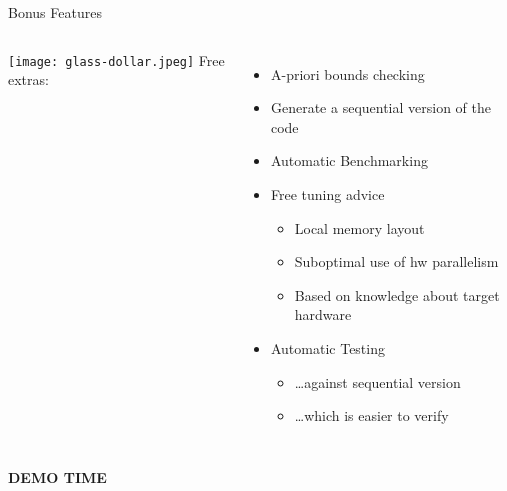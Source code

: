 \documentclass[english,compress]{beamer}
\def\bigncentered#1{
  \begin{center}
    \Huge\bfseries #1
  \end{center}
}
\begin{document}
\begin{frame}{Bonus Features}
  \begin{columns}
      \texttt{[image: glass-dollar.jpeg]}
      Free extras:
      \begin{itemize}
        \item A-priori bounds checking
        \item Generate a sequential version of the code
        \item Automatic Benchmarking
        \item Free tuning advice
          \begin{itemize}
            \item Local memory layout
            \item Suboptimal use of hw parallelism
            \item Based on knowledge about target hardware
          \end{itemize}
        \item Automatic Testing
          \begin{itemize}
            \item \dots against sequential version
            \item \dots which is easier to verify
          \end{itemize}
      \end{itemize}
  \end{columns}
\end{frame}
\begin{frame}
  \bigncentered{DEMO TIME}
\end{frame}

\end{document}
